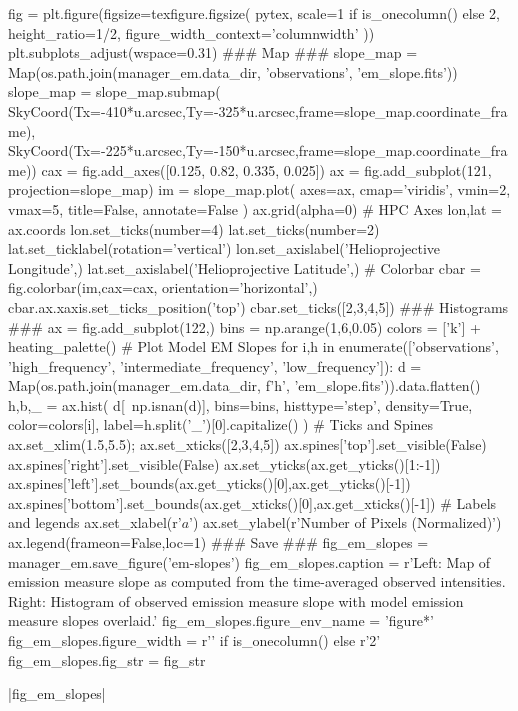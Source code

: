 \begin{pycode}[manager_em]
fig = plt.figure(figsize=texfigure.figsize(
    pytex,
    scale=1 if is_onecolumn() else 2,
    height_ratio=1/2,
    figure_width_context='columnwidth'
))
plt.subplots_adjust(wspace=0.31)
### Map ###
slope_map = Map(os.path.join(manager_em.data_dir, 'observations', 'em_slope.fits'))
slope_map = slope_map.submap(
    SkyCoord(Tx=-410*u.arcsec,Ty=-325*u.arcsec,frame=slope_map.coordinate_frame),
    SkyCoord(Tx=-225*u.arcsec,Ty=-150*u.arcsec,frame=slope_map.coordinate_frame))
cax = fig.add_axes([0.125, 0.82, 0.335, 0.025])
ax = fig.add_subplot(121, projection=slope_map)
im = slope_map.plot(
    axes=ax,
    cmap='viridis',
    vmin=2, vmax=5,
    title=False, annotate=False
)
ax.grid(alpha=0)
# HPC Axes
lon,lat = ax.coords
lon.set_ticks(number=4)
lat.set_ticks(number=2)
lat.set_ticklabel(rotation='vertical')
lon.set_axislabel('Helioprojective Longitude',)
lat.set_axislabel('Helioprojective Latitude',)
# Colorbar
cbar = fig.colorbar(im,cax=cax, orientation='horizontal',)
cbar.ax.xaxis.set_ticks_position('top')
cbar.set_ticks([2,3,4,5])
### Histograms ###
ax = fig.add_subplot(122,)
bins = np.arange(1,6,0.05)
colors = ['k'] + heating_palette()
# Plot Model EM Slopes
for i,h in enumerate(['observations', 'high_frequency', 'intermediate_frequency', 'low_frequency']):
    d = Map(os.path.join(manager_em.data_dir, f'{h}', 'em_slope.fits')).data.flatten()
    h,b,_ = ax.hist(
        d[~np.isnan(d)],
        bins=bins,
        histtype='step',
        density=True,
        color=colors[i],
        label=h.split('_')[0].capitalize()
    )
# Ticks and Spines
ax.set_xlim(1.5,5.5);
ax.set_xticks([2,3,4,5])
ax.spines['top'].set_visible(False)
ax.spines['right'].set_visible(False)
ax.set_yticks(ax.get_yticks()[1:-1])
ax.spines['left'].set_bounds(ax.get_yticks()[0],ax.get_yticks()[-1])
ax.spines['bottom'].set_bounds(ax.get_xticks()[0],ax.get_xticks()[-1])
# Labels and legends
ax.set_xlabel(r'$a$')
ax.set_ylabel(r'Number of Pixels (Normalized)')
ax.legend(frameon=False,loc=1)
### Save ###
fig_em_slopes = manager_em.save_figure('em-slopes')
fig_em_slopes.caption = r'Left: Map of emission measure slope as computed from the time-averaged observed intensities. Right: Histogram of observed emission measure slope with model emission measure slopes overlaid.'
fig_em_slopes.figure_env_name = 'figure*'
fig_em_slopes.figure_width = r'\columnwidth' if is_onecolumn() else r'2\columnwidth'
fig_em_slopes.fig_str = fig_str
\end{pycode}
\py[manager_em]|fig_em_slopes|

